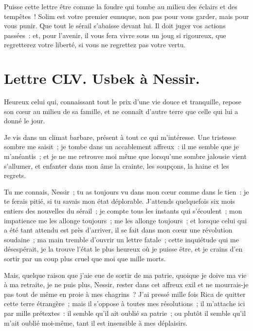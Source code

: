 \documentclass[french,twoside]{book} %
\newcommand{\dateline}[1]{\medskip{\RaggedLeft{#1}\par}\bigskip}
\begin{document}
\noindent Puisse cette lettre être comme la foudre qui tombe au milieu des éclairs et des tempêtes ! Solim est votre premier eunuque, non pas pour vous garder, mais pour vous punir. Que tout le sérail s’abaisse devant lui. Il doit juger vos actions passées : et, pour l’avenir, il vous fera vivre sous un joug si rigoureux, que regretterez votre liberté, si vous ne regrettez pas votre vertu.\par

\dateline{De Paris, le 4 de la lune de Chahban, 1719.}
\section[{Lettre CLV. Usbek à Nessir.}]{Lettre CLV. Usbek à Nessir.}\renewcommand{\leftmark}{Lettre CLV. Usbek à Nessir.}

\noindent Heureux celui qui, connaissant tout le prix d’une vie douce et tranquille, repose son cœur au milieu de sa famille, et ne connaît d’autre terre que celle qui lui a donné le jour.\par
Je vis dans un climat barbare, présent à tout ce qui m’intéresse. Une tristesse sombre me saisit ; je tombe dans un accablement affreux : il me semble que je m’anéantis ; et je ne me retrouve moi même que lorsqu’une sombre jalousie vient s’allumer, et enfanter dans mon âme la crainte, les soupçons, la haine et les regrets.\par
Tu me connais, Nessir ; tu as toujours vu dans mon cœur comme dans le tien : je te ferais pitié, si tu savais mon état déplorable. J’attends quelquefois six mois entiers des nouvelles du sérail ; je compte tous les instants qui s’écoulent ; mon impatience me les allonge toujours ; me les allonge toujours ; et lorsque celui qui a été tant attendu est près d’arriver, il se fait dans mon cœur une révolution soudaine ; ma main tremble d’ouvrir un lettre fatale ; cette inquiétude qui me désespérait, je la trouve l’état le plus heureux où je puisse être, et je crains d’en sortir par un coup plus cruel que moi que mille morts.\par
Mais, quelque raison que j’aie eue de sortir de ma patrie, quoique je doive ma vie à ma retraite, je ne puis plus, Nessir, rester dans cet affreux exil et ne mourrais-je pas tout de même en proie à mes chagrins ? J’ai pressé mille fois Rica de quitter cette terre étrangère ; mais il s’oppose à toutes mes résolutions ; il m’attache ici par mille prétextes : il semble qu’il ait oublié sa patrie ; ou plutôt il semble qu’il m’ait oublié moi-même, tant il est insensible à mes déplaisirs.\par
\end{document}
